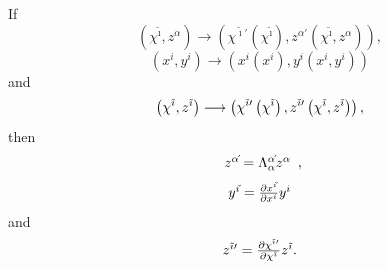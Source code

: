 \documentclass[11pt]{article}
\begin{document}
\begin{itemize}
If%
\begin{equation*}
\left( \chi ^{\tilde{\imath}},z^{\alpha }\right) \longrightarrow \left( \chi
^{\tilde{\imath}\prime }\left( \chi ^{\tilde{\imath}}\right) ,z^{\alpha
\prime }\left( \chi ^{\tilde{\imath}},z^{\alpha }\right) \right) ,
\end{equation*}%
\begin{equation*}
\left( x^{i},y^{i}\right) \longrightarrow \left( x^{i%
{\acute{}}%
}\left( x^{i}\right) ,y^{i%
{\acute{}}%
}\left( x^{i},y^{i}\right) \right)
\end{equation*}%
and
\begin{equation*}
\left( \chi ^{\tilde{\imath}},z^{\tilde{\imath}}\right) \longrightarrow
\left( \chi ^{\tilde{\imath}\prime }\left( \chi ^{\tilde{\imath}}\right) ,z^{%
\tilde{\imath}\prime }\left( \chi ^{\tilde{\imath}},z^{\tilde{\imath}%
}\right) \right) ,
\end{equation*}%
then
\begin{equation*}
\begin{array}[b]{c}
z^{\alpha
{\acute{}}%
}=\Lambda _{\alpha }^{\alpha
{\acute{}}%
}z^{\alpha }%
\end{array}%
,
\end{equation*}%
\begin{equation*}
\begin{array}[b]{c}
y^{i%
{\acute{}}%
}=\frac{\partial x^{i%
{\acute{}}%
}}{\partial x^{i}}y^{i}%
\end{array}%
\end{equation*}%
and
\begin{equation*}
\begin{array}{c}
z^{\tilde{\imath}\prime }=\frac{\partial \chi ^{\tilde{\imath}\prime }}{%
\partial \chi ^{\tilde{\imath}}}z^{\tilde{\imath}}.%
\end{array}%
\end{equation*}


\end{itemize}
\end{document}
